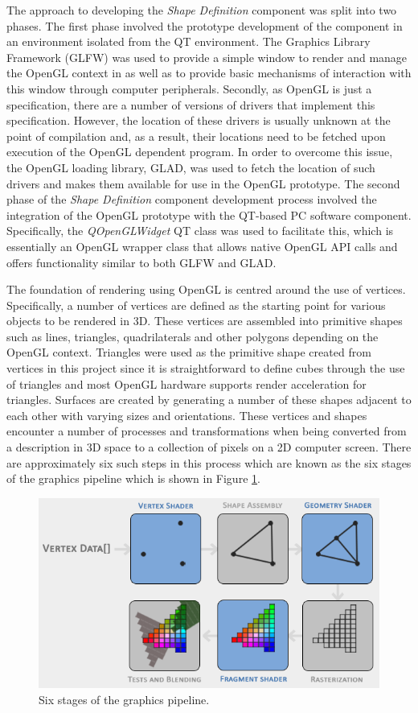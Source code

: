 The approach to developing the \textit{Shape Definition} component was split into two phases. The first phase involved the prototype development of the component in an environment isolated from the QT environment. The Graphics Library Framework (GLFW) was used to provide a simple window to render and manage the OpenGL context in as well as to provide basic mechanisms of interaction with this window through computer peripherals. Secondly, as OpenGL is just a specification, there are a number of versions of drivers that implement this specification. However, the location of these drivers is usually unknown at the point of compilation and, as a result, their locations need to be fetched upon execution of the OpenGL dependent program. In order to overcome this issue, the OpenGL loading library, GLAD, was used to fetch the location of such drivers and makes them available for use in the OpenGL prototype. The second phase of the \textit{Shape Definition} component development process involved the integration of the OpenGL prototype with the QT-based PC software component. Specifically, the \textit{QOpenGLWidget} QT class was used to facilitate this, which is essentially an OpenGL wrapper class that allows native OpenGL API calls and offers functionality similar to both GLFW and GLAD.

The foundation of rendering using OpenGL is centred around the use of vertices. Specifically, a number of vertices are defined as the starting point for various objects to be rendered in 3D. These vertices are assembled into primitive shapes such as lines, triangles, quadrilaterals and other polygons depending on the OpenGL context. Triangles were used as the primitive shape created from vertices in this project since it is straightforward to define cubes through the use of triangles and most OpenGL hardware supports render acceleration for triangles. Surfaces are created by generating a number of these shapes adjacent to each other with varying sizes and orientations. These vertices and shapes encounter a number of processes and transformations when being converted from a description in 3D space to a collection of pixels on a 2D computer screen. There are approximately six such steps in this process which are known as the six stages of the graphics pipeline which is shown in Figure \ref{fig:graphics-pipeline}.


\begin{figure}[H]
	\centering
	\includegraphics[width=0.7\linewidth]{figures/graphics-pipeline.PNG}
	\caption{Six stages of the graphics pipeline.}
	\label{fig:graphics-pipeline}
\end{figure}

